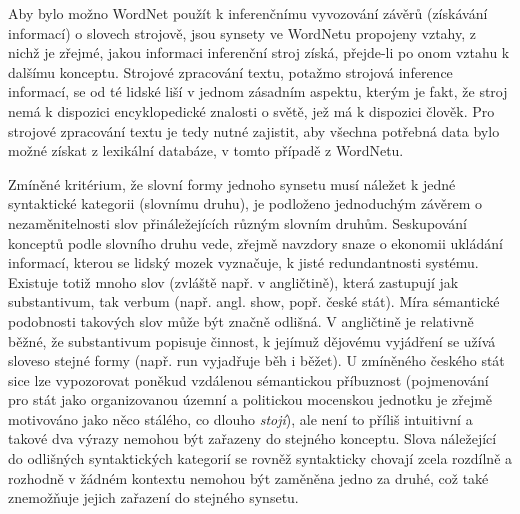 \documentclass[a4paper, 11pt, oneside]{book}
\newcommand\ex{\textsf}
\begin{document}
					Aby bylo možno WordNet použít k inferenčnímu vyvozování závěrů (získávání informací) o slovech strojově, jsou synsety ve WordNetu propojeny vztahy, z nichž je zřejmé, jakou informaci inferenční stroj získá, přejde-li po onom vztahu k dalšímu konceptu. Strojové zpracování textu, potažmo strojová inference informací, se od té lidské liší v jednom zásadním aspektu, kterým je fakt, že stroj nemá k dispozici encyklopedické znalosti o světě, jež má k dispozici člověk. Pro strojové zpracování textu je tedy nutné zajistit, aby všechna potřebná data bylo možné získat z lexikální databáze, v tomto případě z WordNetu.

					Zmíněné kritérium, že slovní formy jednoho synsetu musí náležet k jedné syntaktické kategorii (slovnímu druhu), je podloženo jednoduchým závěrem o nezaměnitelnosti slov přináležejících různým slovním druhům.%
					Seskupování konceptů podle slovního druhu vede, zřejmě navzdory snaze o ekonomii ukládání informací, kterou se lidský mozek vyznačuje, k jisté redundantnosti systému. Existuje totiž mnoho slov (zvláště např. v angličtině), která zastupují jak substantivum, tak verbum (např. angl. \ex{show}, popř. české \ex{stát}). Míra sémantické podobnosti takových slov může být značně odlišná. V angličtině je relativně běžné, že substantivum popisuje činnost, k jejímuž dějovému vyjádření se užívá sloveso stejné formy (např. \ex{run} vyjadřuje \ex{běh} i \ex{běžet}). U zmíněného českého \ex{stát} sice lze vypozorovat poněkud vzdálenou sémantickou příbuznost (pojmenování pro stát jako organizovanou územní a politickou mocenskou jednotku \parencite{Dorling2003oxforddic} je zřejmě motivováno jako něco stálého, co dlouho \textit{stojí}), ale není to příliš intuitivní a takové dva výrazy nemohou být zařazeny do stejného konceptu. Slova náležející do odlišných syntaktických kategorií se rovněž syntakticky chovají zcela rozdílně a rozhodně v žádném kontextu nemohou být zaměněna jedno za druhé, což také znemožňuje jejich zařazení do stejného synsetu. \parencite{miller1990introduction} 
\end{document}
